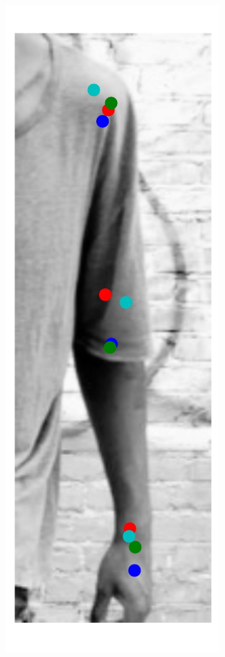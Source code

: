 \begin{figure}[t!]
\begin{subfigure}[b]{0.05\textwidth}
    \end{subfigure}
    \hfill
    \begin{subfigure}[b]{0.05\textwidth}
            \includegraphics[width=\textwidth]{resources/Fig_Variance/image_1}

\end{subfigure}
\end{figure}
